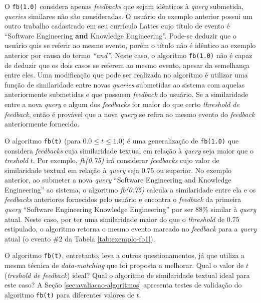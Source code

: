 \documentclass[12pt]{article}
\newcommand{\quotes}[1]{``#1''}
\begin{document}
O \texttt{fb(1.0)} considera apenas \textit{feedbacks} que sejam idênticos à \textit{query} submetida, \textit{queries} similares não são consideradas. O usuário do exemplo anterior possui um outro trabalho cadastrado em seu currículo Lattes cujo título de evento é \quotes{Software Engineering \textbf{and} Knowledge Engineering}. Pode-se deduzir que o usuário quis se referir ao mesmo evento, porém o título não é idêntico ao exemplo anterior por causa do termo \textit{\quotes{and}}. Neste caso, o algoritmo \texttt{fb(1.0)} não é capaz de deduzir que os dois casos se referem ao mesmo evento, apesar da semelhança entre eles. Uma modificação que pode ser realizada no algoritmo é utilizar uma função de similaridade entre novas \textit{queries} submetidas ao sistema com aquelas anteriormente submetidas e que possuem \textit{feedback} do usuário. Se a similaridade entre a nova \textit{query} e algum dos \textit{feedbacks} for maior do que certo \textit{threshold de feedback}, então é provável que a nova \textit{query} se refira ao mesmo evento do \textit{feedback} anteriormente fornecido.

O algoritmo \texttt{fb(t)} (para $0.0 \le t \le 1.0$) é uma generalização de \texttt{fb(1.0)} que considera \textit{feedbacks} cuja similaridade textual em relação à \textit{query} seja maior que o \textit{treshold} $t$. Por exemplo, \textit{fb(0.75)} irá considerar \textit{feedbacks} cujo valor de similaridade textual em relação à \textit{query} seja $0.75$ ou superior. No exemplo anterior, ao submeter a nova \textit{query} \quotes{Software Engineering and Knowledge Engineering} ao sistema, o algoritmo \textit{fb(0.75)} calcula a similaridade entre ela e os \textit{feedbacks} anteriores fornecidos pelo usuário e encontra o \textit{feedback} da primeira \textit{query} \quotes{Software Engineering Knowledge Engineering} por ser 88\% similar à \textit{query} atual. Neste caso, por ter uma similaridade maior do que o \textit{threshold} de $0.75$ estipulado, o algoritmo retorna o mesmo evento marcado no \textit{feedback} para a \textit{query} atual (o evento \#2 da Tabela \ref{tab:exemplo-fb1}).

O algoritmo \texttt{fb(t)}, entretanto, leva a outros questionamentos, já que utiliza a mesma técnica de \textit{data-matching} que foi proposta a melhorar. Qual o valor de $t$ (\textit{treshold de feedback}) ideal? Qual o algoritmo de similaridade textual ideal para este caso? A Seção \ref{sec:avaliacao-algoritmos} apresenta testes de validação do algoritmo \texttt{fb(t)} para diferentes valores de $t$.
\end{document}
